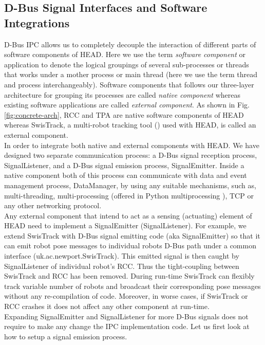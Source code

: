 \subsection*{D-Bus Signal Interfaces and Software Integrations}
D-Bus IPC allows us to completely decouple the interaction of different parts of software components of HEAD. Here we use the term {\em software component} or application to denote the logical groupings of several sub-processes or threads that works under a mother process or main thread (here we use the term thread and process interchangeably). Software components that follows our three-layer architecture for grouping its processes are called {\em native component} whereas existing software applications are called {\em external component}. As shown in Fig. \ref{fig:concrete-arch}, RCC and TPA are native software components of HEAD whereas SwisTrack, a multi-robot tracking tool (\cite{Lochmatter+2008}) used with HEAD, is called an external component.\\
In order to integrate both native and external components with HEAD. We have designed two separate communication process: a D-Bus signal reception process, SignalListener, and a D-Bus signal emission process, SignalEmitter. Inside a native component both of this process can communicate with data and event management process, DataManager, by using any suitable mechanisms, such as, multi-threading, multi-processing (offered in Python multiprocessing ), TCP or any other networking protocol.\\
Any external component that intend to act as a sensing (actuating) element of HEAD need to implement a SignalEmitter (SignalListener). For example, we extend SwisTrack with D-Bus signal emitting code (aka SignalEmitter) so that it can emit robot pose messages to individual robots D-Bus path under a common interface (uk.ac.newport.SwisTrack). This emitted signal is then caught by SignalListener of individual robot's RCC. Thus the tight-coupling between SwisTrack and RCC has been removed. During run-time SwisTrack can flexibly track variable number of robots and broadcast their corresponding pose messages without any re-compilation of code. Moreover, in worse cases, if SwisTrack or RCC crashes it does not affect any other component at run-time.\\
Expanding SignalEmitter and SignalListener for more D-Bus signals does not require to make any change the IPC implementation code. Let us first look at how to setup a signal emission process.

